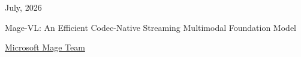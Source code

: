 \documentclass[11pt]{article}
\begin{document}
\thispagestyle{empty}

\noindent
\begin{minipage}[c]{0.5\linewidth}
\raggedright
\raisebox{-0.5\height}{\msftbrandmark}
\end{minipage}
\begin{minipage}[c]{0.49\linewidth}
\raggedleft
{\msftdatefont\small\color{msftgray}July, 2026}    %
\end{minipage}\par
\vspace{0.35em}
\noindent{\color{msftline}\rule{\linewidth}{0.8pt}\par}

\vspace{1.0em}
\begin{center}
{{\msfttitlefont\fontsize{21}{25}\selectfont\color{msftdark}
Mage-VL: An Efficient Codec-Native Streaming Multimodal Foundation Model\par}}
\vspace{1.25em}




{\normalsize\rmfamily\color{msftdark}
\hyperref[sec:contributor]{Microsoft Mage Team}\par



}

\end{center}
\end{document}
